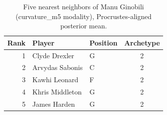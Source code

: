 \begin{table}[htbp]
  \centering\small
  \begin{tabular}{rllc}
    \toprule
    Rank & Player & Position & Archetype \\
    \midrule
    1 & Clyde Drexler & G & 2 \\
    2 & Arvydas Sabonis & C & 2 \\
    3 & Kawhi Leonard & F & 2 \\
    4 & Khris Middleton & G & 2 \\
    5 & James Harden & G & 2 \\
    \bottomrule
  \end{tabular}
  \caption{Five nearest neighbors of Manu Ginobili (curvature_m5 modality), Procrustes-aligned posterior mean.}
  \label{tab:Manu_Ginobili_neighbors_curvature_m5}
\end{table}

